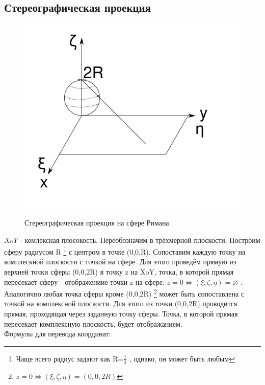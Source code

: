 \documentclass{article}
\begin{document}
        \subsection{Стереографическая проекция}
            \begin{figure}[h]
                \includegraphics[width=0.8\linewidth]{stereo_example}
                \caption{Стереографическая проекция на сфере Римана}
                \label{ris:stereo_example}
            \end{figure}
            $X o Y$ - комлексная плосокость. Переобозначим в трёхмерной плоскости. Построим сферу радиусом R \footnote{Чаще всего радиус задают как R=$\frac{1}{2}$ , однако, он может быть любым} с центром в точке (0,0,R). Сопоставим каждую точку на комплескной плоскости с точкой на сфере. Для этого проведём прямую из верхней точки сферы (0,0,2R) в точку z на XoY, точка, в которой прямая пересекает сферу - отображениие точки z на сфере. $z=0 \Leftrightarrow (\xi,\zeta,\eta)=\varnothing$ . Аналогично любая точка сферы кроме (0,0,2R) \footnote{$z=0 \Leftrightarrow (\xi,\zeta,\eta)=(0,0,2R)$} может быть сопоставлена с точкой на комплексной плоскости. Для этого из точки (0,0,2R) проводится прямая, проходящая через заданную точку сферы. Точка, в которой прямая пересекает комплексную плоскость, будет отображанием.\\
          Формулы для перевода координат:
\end{document}
